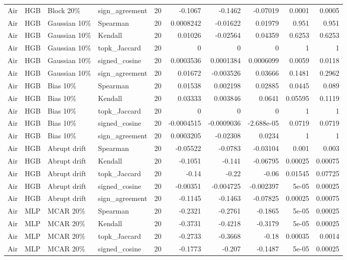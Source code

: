 \begin{tabular}{llllrrrrrr}
Air & HGB & Block 20\% & sign\_agreement & 20 & -0.1067 & -0.1462 & -0.07019 & 0.0001 & 0.0005 \\
Air & HGB & Gaussian 10\% & Spearman & 20 & 0.0008242 & -0.01622 & 0.01979 & 0.951 & 0.951 \\
Air & HGB & Gaussian 10\% & Kendall & 20 & 0.01026 & -0.02564 & 0.04359 & 0.6253 & 0.6253 \\
Air & HGB & Gaussian 10\% & topk\_Jaccard & 20 & 0 & 0 & 0 & 1 & 1 \\
Air & HGB & Gaussian 10\% & signed\_cosine & 20 & 0.0003536 & 0.0001384 & 0.0006099 & 0.0059 & 0.0118 \\
Air & HGB & Gaussian 10\% & sign\_agreement & 20 & 0.01672 & -0.003526 & 0.03666 & 0.1481 & 0.2962 \\
Air & HGB & Bias 10\% & Spearman & 20 & 0.01538 & 0.002198 & 0.02885 & 0.0445 & 0.089 \\
Air & HGB & Bias 10\% & Kendall & 20 & 0.03333 & 0.003846 & 0.0641 & 0.05595 & 0.1119 \\
Air & HGB & Bias 10\% & topk\_Jaccard & 20 & 0 & 0 & 0 & 1 & 1 \\
Air & HGB & Bias 10\% & signed\_cosine & 20 & -0.0004515 & -0.0009036 & -2.688e-05 & 0.0719 & 0.0719 \\
Air & HGB & Bias 10\% & sign\_agreement & 20 & 0.0003205 & -0.02308 & 0.0234 & 1 & 1 \\
Air & HGB & Abrupt drift & Spearman & 20 & -0.05522 & -0.0783 & -0.03104 & 0.001 & 0.003 \\
Air & HGB & Abrupt drift & Kendall & 20 & -0.1051 & -0.141 & -0.06795 & 0.00025 & 0.00075 \\
Air & HGB & Abrupt drift & topk\_Jaccard & 20 & -0.14 & -0.22 & -0.06 & 0.01545 & 0.07725 \\
Air & HGB & Abrupt drift & signed\_cosine & 20 & -0.00351 & -0.004725 & -0.002397 & 5e-05 & 0.00025 \\
Air & HGB & Abrupt drift & sign\_agreement & 20 & -0.1145 & -0.1463 & -0.07825 & 0.00025 & 0.00075 \\
Air & MLP & MCAR 20\% & Spearman & 20 & -0.2321 & -0.2761 & -0.1865 & 5e-05 & 0.00025 \\
Air & MLP & MCAR 20\% & Kendall & 20 & -0.3731 & -0.4218 & -0.3179 & 5e-05 & 0.00025 \\
Air & MLP & MCAR 20\% & topk\_Jaccard & 20 & -0.2733 & -0.3668 & -0.18 & 0.00035 & 0.0014 \\
Air & MLP & MCAR 20\% & signed\_cosine & 20 & -0.1773 & -0.207 & -0.1487 & 5e-05 & 0.00025 \\

\end{tabular}
